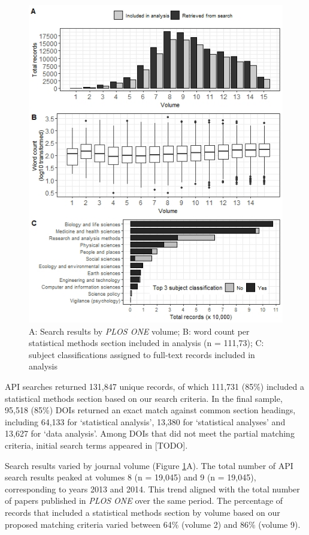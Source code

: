 \documentclass[12pt]{article}
\begin{document}
\begin{figure}
\centering
\includegraphics{figures/figure1.jpg}
\caption{\label{fig:plos-n}A: Search results by \emph{PLOS ONE} volume;
B: word count per statistical methods section included in analysis (n =
111,73); C: subject classifications assigned to full-text records
included in analysis}
\end{figure}

API searches returned 131,847 unique records, of which 111,731 (85\%)
included a statistical methods section based on our search criteria. In
the final sample, 95,518 (85\%) DOIs returned an exact match against
common section headings, including 64,133 for `statistical analysis',
13,380 for `statistical analyses' and 13,627 for `data analysis'. Among
DOIs that did not meet the partial matching criteria, initial search
terms appeared in {[}TODO{]}.

Search results varied by journal volume (Figure \ref{fig:plos-n}A). The
total number of API search results peaked at volumes 8 (n = 19,045) and
9 (n = 19,045), corresponding to years 2013 and 2014. This trend aligned
with the total number of papers published in \emph{PLOS ONE} over the
same period. The percentage of records that included a statistical
methods section by volume based on our proposed matching criteria varied
between 64\% (volume 2) and 86\% (volume 9).
\end{document}
